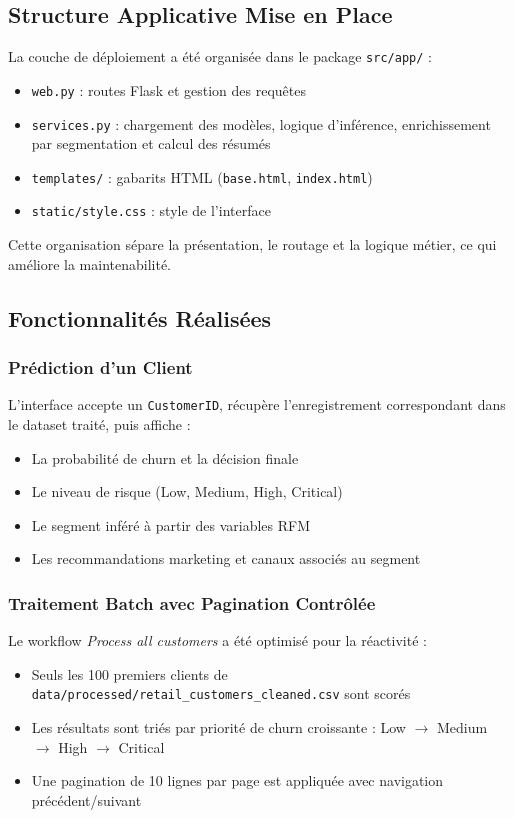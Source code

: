 \documentclass[12pt,a4paper]{article}
\begin{document}
\subsection{Structure Applicative Mise en Place}

La couche de déploiement a été organisée dans le package \texttt{src/app/} :
\begin{itemize}
    \item \texttt{web.py} : routes Flask et gestion des requêtes
    \item \texttt{services.py} : chargement des modèles, logique d'inférence, enrichissement par segmentation et calcul des résumés
    \item \texttt{templates/} : gabarits HTML (\texttt{base.html}, \texttt{index.html})
    \item \texttt{static/style.css} : style de l'interface
\end{itemize}

Cette organisation sépare la présentation, le routage et la logique métier, ce qui améliore la maintenabilité.

\subsection{Fonctionnalités Réalisées}

\subsubsection{Prédiction d'un Client}
L'interface accepte un \texttt{CustomerID}, récupère l'enregistrement correspondant dans le dataset traité, puis affiche :
\begin{itemize}
    \item La probabilité de churn et la décision finale
    \item Le niveau de risque (Low, Medium, High, Critical)
    \item Le segment inféré à partir des variables RFM
    \item Les recommandations marketing et canaux associés au segment
\end{itemize}

\subsubsection{Traitement Batch avec Pagination Contrôlée}
Le workflow \textit{Process all customers} a été optimisé pour la réactivité :
\begin{itemize}
    \item Seuls les 100 premiers clients de \texttt{data/processed/retail\_customers\_cleaned.csv} sont scorés
    \item Les résultats sont triés par priorité de churn croissante : Low $\rightarrow$ Medium $\rightarrow$ High $\rightarrow$ Critical
    \item Une pagination de 10 lignes par page est appliquée avec navigation précédent/suivant
\end{itemize}
\end{document}
